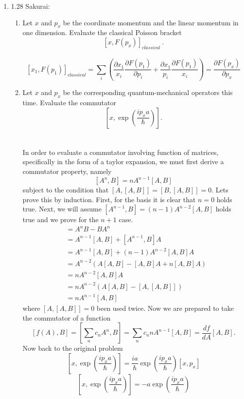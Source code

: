 \documentclass[11pt,letterpaper]{article}
\begin{document}
\begin{enumerate}
\item 1.28 Sakurai: \begin{enumerate}
\item Let $x$ and $p_x$ be the coordinate momentum and the linear momentum in one dimension. Evaluate the classical Poisson bracket
$$[x, F(p_x)]_{classical}~.$$
\\$$[x_1, F(p_1)]_{classical} = \sum_{i}\left({\frac{\partial x_1}{x_i}\frac{\partial F(p_1)}{\partial p_i}+\frac{\partial x_1}{p_i}\frac{\partial F(p_1)}{x_i}}\right) = \frac{\partial F(p_x)}{\partial p_x}$$
\item Let $x$ and $p_x$ be the corresponding quantum-mechanical operators this time. Evaluate the commutator
$$\left[x, \exp{\left(\frac{ip_xa}{\hbar}\right)}\right].$$
\\ \\In order to evaluate a commutator involving function of matrices, specifically in the form of a taylor expansion, we must first derive a commutator property, namely
$$[A^n,B] = nA^{n-1}[A,B]$$
subject to the condition that $[A,[A,B]] = [B,[A,B]] = 0$. Lets prove this by induction. First, for the basis it is clear that $n=0$ holds true. Next, we will assume $[A^{n-1},B] = (n-1)A^{n-2}[A,B]$ holds true and we prove for the $n+1$ case.  
\begin{align*} [A^n,B] &= A^nB-BA^n\\
&=A^{n-1}[A,B] +[A^{n-1},B]A\\
&=A^{n-1}[A,B]+(n-1)A^{n-2}[A,B]A\\
&=A^{n-2}(A[A,B]-[A,B]A+n[A,B]A)\\
&=nA^{n-2}[A,B]A\\
&=nA^{n-2}(A[A,B]-[A,[A,B]])\\
&=nA^{n-1}[A,B]
\end{align*}
where $[A,[A,B]] = 0$ been used twice. Now we are prepared to take the commutator of a function
$$[f(A),B] = [\sum_{n}{c_nA^n},B] = \sum_nc_nnA^{n-1}[A,B] = \frac{df}{dA}[A,B].$$
Now back to the original problem
$$\left[x, \exp{\left(\frac{ip_xa}{\hbar}\right)}\right] = \frac{ia}{\hbar}\exp{\left(\frac{ip_xa}{\hbar}\right)}[x,p_x]$$
$$\left[x, \exp{\left(\frac{ip_xa}{\hbar}\right)}\right] = -a\exp{\left(\frac{ip_xa}{\hbar}\right)}$$


\end{enumerate}
\end{enumerate}
\end{document}
